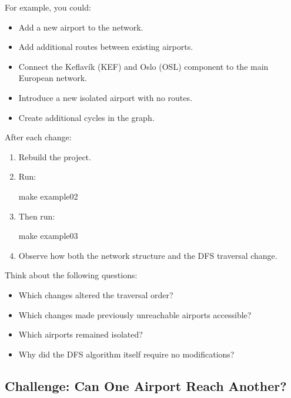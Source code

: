 \documentclass{csc2059practical}
\begin{document}
For example, you could:

\begin{itemize}
    \item Add a new airport to the network.
    \item Add additional routes between existing airports.
    \item Connect the Keflavík (KEF) and Oslo (OSL) component to the main European network.
    \item Introduce a new isolated airport with no routes.
    \item Create additional cycles in the graph.
\end{itemize}

After each change:

\begin{enumerate}
    \item Rebuild the project.
    \item Run:
\begin{terminal}
make example02
\end{terminal}

    \item Then run:

\begin{terminal}
make example03
\end{terminal}

    \item Observe how both the network structure and the DFS traversal change.
\end{enumerate}

\begin{reflectionbox}
Think about the following questions:

\begin{itemize}
    \item Which changes altered the traversal order?
    \item Which changes made previously unreachable airports accessible?
    \item Which airports remained isolated?
    \item Why did the DFS algorithm itself require no modifications?
\end{itemize}
\end{reflectionbox}

\subsection{Challenge: Can One Airport Reach Another?}
\end{document}
